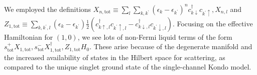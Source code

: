 \documentclass[reprint,prb,superscriptaddress]{revtex4-2}
\begin{document}
We employed the definitions \(X_{n,\text{tot}} \equiv  \sum_l \sum_{k,k^\prime}\left(\epsilon_k - \epsilon_{k^\prime}\right)^n c^\dagger_{k \downarrow}c_{k^\prime \uparrow},  X_{n,l}\) and \( Z_{1,\text{tot}} \equiv \sum_{k,k^\prime,l}\left( \epsilon_k - \epsilon_{k^\prime} \right) \frac{1}{2}\left(c^\dagger_{k \uparrow,l}c_{k^\prime \uparrow,l} - c^\dagger_{k \downarrow,l}c_{k^\prime \downarrow,l}\right)\). Focusing on the effective Hamiltonian for \(\left( 1,0 \right) \), we see lots of non-Fermi liquid terms of the form \(s^+_\text{tot}X_{1,\text{tot}}, s^-_\text{tot}X^\dagger_{1,\text{tot}},Z_{1,\text{tot}} H_0\). These arise because of the degenerate manifold and the increased availability of states in the Hilbert space for scattering, as compared to the unique singlet ground state of the single-channel Kondo model.
\end{document}

